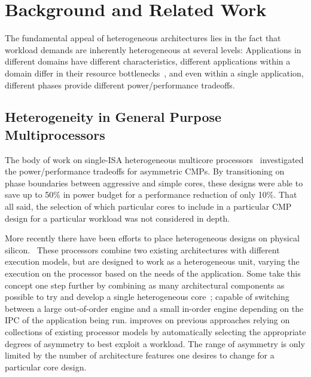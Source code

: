 \section{Background and Related Work}
\label{sec:background}
\label{sec:related}



The fundamental appeal of heterogeneous architectures lies in the fact
that workload demands are inherently heterogeneous at several levels:
Applications in different domains have different characteristics,
different applications within a domain differ in their resource
bottlenecks~\cite{Vasilieospeakpowermicro2010}, and even within a
single application, different phases provide different
power/performance tradeoffs.  

\subsection{Heterogeneity in General Purpose Multiprocessors} 
The body of work on single-ISA heterogeneous multicore
processors~\cite{Kumar03-SIHM,Kumar06-PACT-SIHM,Kumar04-SIHM} investigated the power/performance tradeoffs
for asymmetric CMPs. By transitioning on phase boundaries between
aggressive and simple cores, these designs were able to save up to 50\%
in power budget for a performance reduction of only 10\%. That all said, the
selection of which particular cores to include in a particular CMP
design for a particular workload was not considered in depth. 

More recently there have been efforts to place heterogeneous
designs on physical silicon.~\cite{ARM11-WhitePaper-BigLittle} These
processors combine two existing architectures with different execution
models, but are designed to work as a heterogeneous unit, varying the
execution on the processor based on the needs of the application. Some
take this concept one step further by combining as many architectural
components as possible to try and develop a single heterogeneous 
core~\cite{Lukefahr12-MICRO-CompositeCores}; capable of switching 
between a large out-of-order engine and a small in-order engine
depending on the IPC of the application being run. \Ravan{}
improves on previous approaches relying on collections of existing
processor models by automatically selecting the appropriate degrees of
asymmetry to best exploit a workload. The range of asymmetry is only
limited by the number of architecture features one desires to change for
a particular core design.

